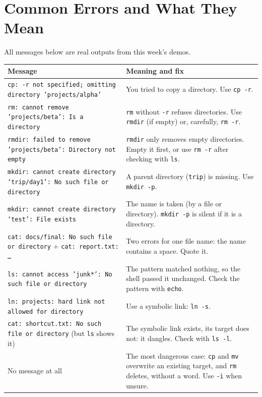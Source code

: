 \documentclass[11pt,a4paper]{article}
\newcommand{\cmd}[1]{\texttt{#1}}
\begin{document}
\section{Common Errors and What They Mean}

All messages below are real outputs from this week's demos.

{\small
\renewcommand{\arraystretch}{1.25}
\begin{longtable}{@{}>{\raggedright\arraybackslash}p{6.9cm} >{\raggedright\arraybackslash}p{7.6cm}@{}}
\toprule
\textbf{Message} & \textbf{Meaning and fix} \\
\midrule
\endhead
\texttt{cp: -r not specified; omitting directory 'projects/alpha'} & You tried to copy a directory. Use \cmd{cp -r}. \\
\texttt{rm: cannot remove 'projects/beta': Is a directory} & \cmd{rm} without \cmd{-r} refuses directories. Use \cmd{rmdir} (if empty) or, carefully, \cmd{rm -r}. \\
\texttt{rmdir: failed to remove 'projects/beta': Directory not empty} & \cmd{rmdir} only removes empty directories. Empty it first, or use \cmd{rm -r} after checking with \cmd{ls}. \\
\texttt{mkdir: cannot create directory ‘trip/day1’: No such file or directory} & A parent directory (\texttt{trip}) is missing. Use \cmd{mkdir -p}. \\
\texttt{mkdir: cannot create directory ‘test’: File exists} & The name is taken (by a file or directory). \cmd{mkdir -p} is silent if it is a directory. \\
\texttt{cat: docs/final: No such file or directory} + \texttt{cat: report.txt: \dots} & Two errors for one file name: the name contains a space. Quote it. \\
\texttt{ls: cannot access 'junk*': No such file or directory} & The pattern matched nothing, so the shell passed it unchanged. Check the pattern with \cmd{echo}. \\
\texttt{ln: projects: hard link not allowed for directory} & Use a symbolic link: \cmd{ln -s}. \\
\texttt{cat: shortcut.txt: No such file or directory} (but \cmd{ls} shows it) & The symbolic link exists, its target does not: it dangles. Check with \cmd{ls -l}. \\
No message at all & The most dangerous case: \cmd{cp} and \cmd{mv} overwrite an existing target, and \cmd{rm} deletes, without a word. Use \cmd{-i} when unsure. \\
\bottomrule
\end{longtable}
}
\end{document}
